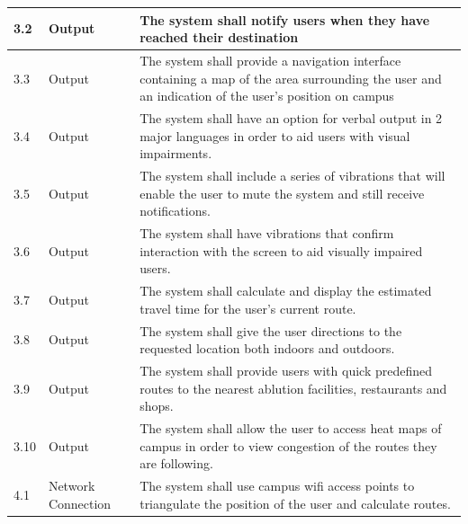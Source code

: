 \documentclass[11pt]{article}
\begin{document}
\begin{longtable}{|p{}| p{} | p{} |}
\hline

3.2& Output &The system shall notify users when they have reached their destination \\

\hline

3.3& Output & The system shall provide a navigation interface containing a map of the area surrounding the user and an indication of the user's position on campus\\

\hline

3.4& Output & The system shall have an option for verbal output in 2 major languages in order to aid users with visual impairments.\\

\hline

3.5& Output & The system shall include a series of vibrations that will enable the user to mute the system and still receive notifications.\\

\hline

3.6& Output & The system shall have vibrations that confirm interaction with the screen to aid visually impaired users.\\

\hline

3.7& Output & The system shall calculate and display the estimated travel time for the user's current route.\\

\hline

3.8& Output & The system shall give the user directions to the requested location both indoors and outdoors.\\

\hline

3.9& Output& The system shall provide users with quick predefined routes to the nearest ablution facilities, restaurants and shops.\\

\hline

3.10& Output& The system shall allow the user to access heat maps of campus in order to view congestion of the routes they are following.\\

\hline

4.1& Network Connection & The system shall use campus wifi access points to triangulate the position of the user and calculate routes.  \\

\hline


\end{longtable}
\end{document}
